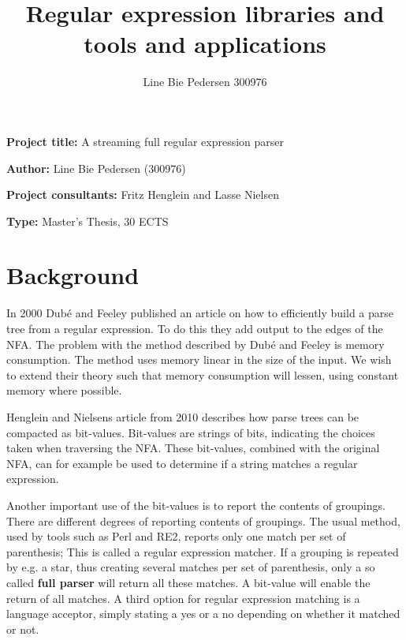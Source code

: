 \documentclass[10pt, a4paper]{article}
\title{Regular expression libraries and tools and applications}
\author{Line Bie Pedersen 300976}
\newlength{\Mylen}
\newcommand{\entrylabel}[1]{%
  \settowidth{\Mylen}{#1}%
  \ifthenelse{\lengthtest{\Mylen > \labelwidth}}%
  {\parbox[b]{\labelwidth}%
    {\makebox[0pt][l]{#1}\\}}%
  {#1}%
  \hfil\relax}
\newenvironment{entry}
{\begin{list}{}%
    {\renewcommand{\makelabel}{\entrylabel}%
      \setlength{\labelwidth}{35pt}%
      \setlength{\leftmargin}{\labelwidth+\labelsep}%
    }%
  }%
{\end{list}}
\begin{document}
\begin{entry}
\item[\bf{Project title:}] A streaming full regular expression parser
\item[\bf{Author:}] Line Bie Pedersen (300976)
\item[\bf{Project consultants:}] Fritz Henglein and Lasse Nielsen
\item[\bf{Type:}] Master's Thesis, 30 ECTS
\end{entry}

\section*{Background}


In 2000 Dub\'{e} and Feeley \cite{Dube2000} published an article on
how to efficiently build a parse tree from a regular expression. To do
this they add output to the edges of the NFA. The problem with the
method described by Dub\'{e} and Feeley is memory consumption. The
method uses memory linear in the size of the input. We wish to extend
their theory such that memory consumption will lessen, using constant
memory where possible.

Henglein and Nielsens article from 2010 \cite{Henglein2010} describes
how parse trees can be compacted as bit-values. Bit-values are strings
of bits, indicating the choices taken when traversing the NFA. These
bit-values, combined with the original NFA, can for example be used to
determine if a string matches a regular expression.

Another important use of the bit-values is to report the contents of
groupings. There are different degrees of reporting contents of
groupings. The usual method, used by tools such as Perl and RE2,
reports only one match per set of parenthesis; This is called a
regular expression matcher. If a grouping is repeated by e.g. a star,
thus creating several matches per set of parenthesis, only a so called
\textbf{full parser} will return all these matches. A bit-value will
enable the return of all matches. A third option for regular
expression matching is a language acceptor, simply stating a yes or a
no depending on whether it matched or not.


\end{document}
